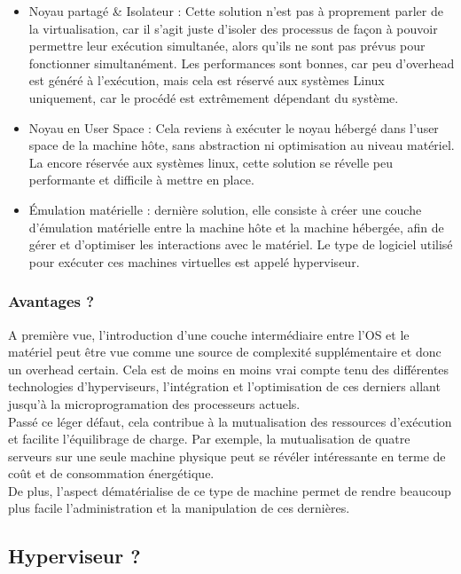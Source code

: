 \begin{itemize}
\item Noyau partagé \& Isolateur : Cette solution n'est pas à proprement parler de la virtualisation, car il s'agit juste d'isoler des processus de façon à pouvoir permettre leur exécution simultanée, alors qu'ils ne sont pas prévus pour fonctionner simultanément. Les performances sont bonnes, car peu d'overhead est généré à l'exécution, mais cela est réservé aux systèmes Linux uniquement, car le procédé est extrêmement dépendant du système.
\item Noyau en User Space : Cela reviens à exécuter le noyau hébergé dans l'user space de la machine hôte, sans abstraction ni optimisation au niveau matériel. La encore réservée aux systèmes linux, cette solution se révelle peu performante et difficile à mettre en place.
\item Émulation matérielle  : dernière solution, elle consiste à créer une couche d'émulation matérielle entre la machine hôte et la machine hébergée, afin de gérer et d'optimiser les interactions avec le matériel. Le type de logiciel utilisé pour exécuter ces machines virtuelles est appelé hyperviseur.
\end{itemize}

\subsubsection{Avantages ?}

A première vue, l'introduction d'une couche intermédiaire entre l'OS et le matériel peut être vue comme une source de complexité supplémentaire et donc un overhead certain. Cela est de moins en moins vrai compte tenu des différentes technologies d'hyperviseurs, l'intégration et l'optimisation de ces derniers allant jusqu'à la microprogramation des processeurs actuels.\\
Passé ce léger défaut, cela contribue à la mutualisation des ressources d'exécution et facilite l'équilibrage de charge. Par exemple, la mutualisation de quatre serveurs sur une seule machine physique peut se révéler intéressante en terme de coût et de consommation énergétique.\\
De plus, l'aspect dématérialise de ce type de machine permet de rendre beaucoup plus facile l'administration et la manipulation de ces dernières.

\subsection{Hyperviseur ?}

